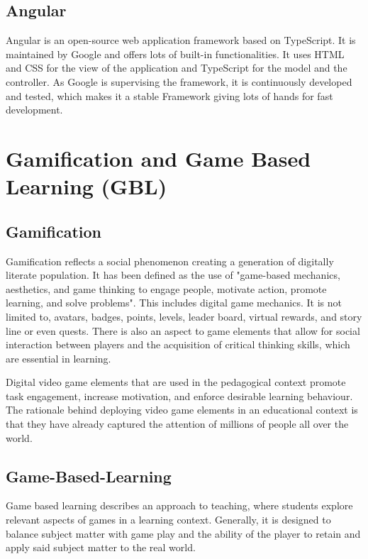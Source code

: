\subsection{Angular}\label{subsec:angular}
Angular is an open-source web application framework based on TypeScript.
It is maintained by Google and offers lots of built-in functionalities.
It uses HTML and CSS for the view of the application and TypeScript for the model and the controller.
As Google is supervising the framework, it is continuously developed and tested,
which makes it a stable Framework giving lots of hands for fast development.

\section{Gamification and Game Based Learning (GBL)}\label{sec:gamification-and-game-based-learninggbl}
\subsection{Gamification}\label{subsec:gamification}
Gamification reflects a social phenomenon creating a generation of digitally literate population.
It has been defined as the use of "game-based mechanics, aesthetics, and game thinking to engage people,
motivate action, promote learning, and solve problems"\cite{kapp2013gamification}.
This includes digital game mechanics. It is not limited to, avatars, badges, points, levels,
leader board, virtual rewards, and story line or even quests.
There is also an aspect to game elements that allow for social interaction between players and the acquisition of
critical thinking skills, which are essential in learning.

Digital video game elements that are used in the pedagogical context promote task engagement, increase motivation,
and enforce desirable learning behaviour.
The rationale behind deploying video game elements in an educational context is that they have already captured the
attention of millions of people all over the world.

\subsection{Game-Based-Learning}\label{subsec:game-based-learning}
Game based learning describes an approach to teaching,
where students explore relevant aspects of games in a learning context.
Generally, it is designed to balance subject matter with game play and the ability of the player
to retain and apply said subject matter to the real world.

